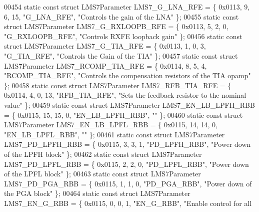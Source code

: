 \begin{DoxyCode}
00454 \textcolor{keyword}{static} \textcolor{keyword}{const} \textcolor{keyword}{struct }LMS7Parameter LMS7_G_LNA_RFE = \{ 0x0113, 9, 6, 15, \textcolor{stringliteral}{"G\_LNA\_RFE"}, \textcolor{stringliteral}{"Controls the gain of
       the LNA"} \};
00455 \textcolor{keyword}{static} \textcolor{keyword}{const} \textcolor{keyword}{struct }LMS7Parameter LMS7_G_RXLOOPB_RFE = \{ 0x0113, 5, 2, 0, \textcolor{stringliteral}{"G\_RXLOOPB\_RFE"}, \textcolor{stringliteral}{"Controls RXFE
       loopback gain"} \};
00456 \textcolor{keyword}{static} \textcolor{keyword}{const} \textcolor{keyword}{struct }LMS7Parameter LMS7_G_TIA_RFE = \{ 0x0113, 1, 0, 3, \textcolor{stringliteral}{"G\_TIA\_RFE"}, \textcolor{stringliteral}{"Controls the Gain of
       the TIA"} \};
00457 \textcolor{keyword}{static} \textcolor{keyword}{const} \textcolor{keyword}{struct }LMS7Parameter LMS7_RCOMP_TIA_RFE = \{ 0x0114, 8, 5, 4, \textcolor{stringliteral}{"RCOMP\_TIA\_RFE"}, \textcolor{stringliteral}{"Controls the
       compensation resistors of the TIA opamp"} \};
00458 \textcolor{keyword}{static} \textcolor{keyword}{const} \textcolor{keyword}{struct }LMS7Parameter LMS7_RFB_TIA_RFE = \{ 0x0114, 4, 0, 13, \textcolor{stringliteral}{"RFB\_TIA\_RFE"}, \textcolor{stringliteral}{"Sets the feedback
       resistor to the nominal value"} \};
00459 \textcolor{keyword}{static} \textcolor{keyword}{const} \textcolor{keyword}{struct }LMS7Parameter LMS7_EN_LB_LPFH_RBB = \{ 0x0115, 15, 15, 0, \textcolor{stringliteral}{"EN\_LB\_LPFH\_RBB"}, \textcolor{stringliteral}{""} \};
00460 \textcolor{keyword}{static} \textcolor{keyword}{const} \textcolor{keyword}{struct }LMS7Parameter LMS7_EN_LB_LPFL_RBB = \{ 0x0115, 14, 14, 0, \textcolor{stringliteral}{"EN\_LB\_LPFL\_RBB"}, \textcolor{stringliteral}{""} \};
00461 \textcolor{keyword}{static} \textcolor{keyword}{const} \textcolor{keyword}{struct }LMS7Parameter LMS7_PD_LPFH_RBB = \{ 0x0115, 3, 3, 1, \textcolor{stringliteral}{"PD\_LPFH\_RBB"}, \textcolor{stringliteral}{"Power down of the
       LPFH block"} \};
00462 \textcolor{keyword}{static} \textcolor{keyword}{const} \textcolor{keyword}{struct }LMS7Parameter LMS7_PD_LPFL_RBB = \{ 0x0115, 2, 2, 0, \textcolor{stringliteral}{"PD\_LPFL\_RBB"}, \textcolor{stringliteral}{"Power down of the
       LPFL block"} \};
00463 \textcolor{keyword}{static} \textcolor{keyword}{const} \textcolor{keyword}{struct }LMS7Parameter LMS7_PD_PGA_RBB = \{ 0x0115, 1, 1, 0, \textcolor{stringliteral}{"PD\_PGA\_RBB"}, \textcolor{stringliteral}{"Power down of the PGA
       block"} \};
00464 \textcolor{keyword}{static} \textcolor{keyword}{const} \textcolor{keyword}{struct }LMS7Parameter LMS7_EN_G_RBB = \{ 0x0115, 0, 0, 1, \textcolor{stringliteral}{"EN\_G\_RBB"}, \textcolor{stringliteral}{"Enable control for all
}
\end{DoxyCode}
